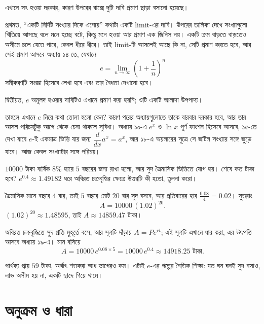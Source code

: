 \documentclass[11pt]{article}
\begin{document}
\begin{remark}
এখানে সৎ হওয়া দরকার, কারণ উপরের বাক্সে দুটি দাবি প্রমাণ ছাড়া বসানো হয়েছে।

প্রথমত, ``একটি নির্দিষ্ট সংখ্যার দিকে এগোয়'' কথাটা একটি limit-এর দাবি। উপরের
তালিকা দেখে সংখ্যাগুলো থিতিয়ে আসছে বলে মনে হচ্ছে বটে, কিন্তু মনে হওয়া আর প্রমাণ
এক জিনিস নয়। একটি ক্রম বাড়তে বাড়তেও অসীমে চলে যেতে পারে, কেবল ধীরে ধীরে।
তাই limit-টি আসলেই আছে কি না, সেটি প্রমাণ করতে হবে, আর সেই প্রমাণ আসবে
অধ্যায় ১৪-তে, যেখানে
\[
  e = \lim_{n \to \infty} \left( 1 + \frac{1}{n} \right)^{n}
\]
সমীকরণটি সংজ্ঞা হিসেবে লেখা হবে এবং তার বৈধতা দেখানো হবে।

দ্বিতীয়ত, $e$ অমূলদ হওয়ার দাবিটিও এখানে প্রমাণ করা হয়নি; ওটি একটি আলাদা
উপপাদ্য।

তাহলে এখানে $e$ নিয়ে কথা তোলা হলো কেন? কারণ পরের অধ্যায়গুলোতে তাকে বারবার
দরকার হবে, আর তার আসল পরিচয়টুকু আগে থেকে চেনা থাকলে সুবিধা। অধ্যায় ১০-এ
$e^{x}$ ও $\ln x$ পূর্ণ ফাংশন হিসেবে আসবে, ১৫-তে দেখা যাবে $e$-ই একমাত্র ভিত্তি
যার জন্য $\dfrac{d}{dx}a^{x} = a^{x}$, আর ১৮-এ অয়লারের সূত্রে সে জটিল সংখ্যার
সঙ্গে জুড়ে যাবে। আজ কেবল সংখ্যাটার সঙ্গে পরিচয়।
\end{remark}

\begin{example}
$10000$ টাকা বার্ষিক $8\%$ হারে $5$ বছরের জন্য রাখা হলো, আর সুদ ত্রৈমাসিক
ভিত্তিতে যোগ হয়। শেষে কত টাকা হবে? $e^{0.4} \approx 1.49182$ ধরে অবিরত
চক্রবৃদ্ধির ক্ষেত্রে উত্তরটি কী হতো, তুলনা করো।
\end{example}

\begin{solbox}
ত্রৈমাসিক মানে বছরে $4$ বার, তাই $5$ বছরে মোট $20$ বার সুদ বসবে, আর প্রতিবারের
হার $\tfrac{0.08}{4} = 0.02$। সুতরাং
\[
  A = 10000\,(1.02)^{20} .
\]
$(1.02)^{20} \approx 1.48595$, তাই $A \approx 14859.47$ টাকা।

অবিরত চক্রবৃদ্ধিতে সুদ প্রতি মুহূর্তে বসে, আর সূত্রটি দাঁড়ায়
$A = P e^{rt}$; এই সূত্রটি এখানে ধার করা, এর উৎপত্তি আসবে অধ্যায় ১৯-এ।
মান বসিয়ে
\[
  A = 10000\, e^{0.08 \times 5} = 10000\, e^{0.4} \approx 14918.25 \text{ টাকা} .
\]

পার্থক্য প্রায় $59$ টাকা, অর্থাৎ শতকরা আধ ভাগেরও কম। এটাই $e$-এর গল্পের
নৈতিক শিক্ষা: যত ঘন ঘনই সুদ বসাও, লাভ অসীম হয় না, একটি ছাদে গিয়ে থামে।
\end{solbox}

\section{অনুক্রম ও ধারা}
\end{document}

